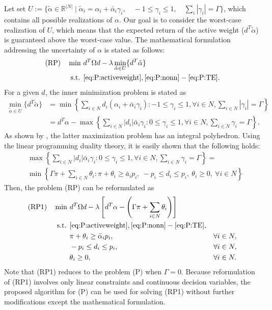 \documentclass[11pt]{article}
\begin{document}
	Let set $U := \{ \tilde \alpha \in \mathbb{R}^{|N|}  \mid \tilde \alpha_i = \alpha_i + \bar{\alpha}_i \gamma_i , \quad -1 \leq \gamma_i\leq 1 , \quad \sum_{i} |\gamma_i| = \Gamma \}$, which contains all possible realizations of $\alpha$. Our goal is to consider the worst-case realization of $U$, which means that the expected return of the active weight ($d^T \tilde{\alpha}$) is guaranteed above the worst-case value. The mathematical formulation addressing the uncertainty of $\alpha$ is stated as follows:
	\begin{align}
	\text{(RP)} \quad \min~ & d^T \Omega d - \lambda \min_{\tilde{\alpha} \in U} \{d^T \tilde{\alpha} \} \label{eq:RP:obj}\\
	\text{s.t. } 
	& \eqref{eq:P:activeweight}, \eqref{eq:P:nonn} - \eqref{eq:P:TE}. \notag
	\end{align}
	For a given $d$, the inner minimization problem is stated as
	\begin{align}
	\min_{\tilde{\alpha} \in U} \{ d^T \tilde{\alpha} \} &= \min \left\{ \sum_{i \in N} d_i (\alpha_i + \bar{\alpha}_i \gamma_i ) : -1 \le \gamma_i \le 1, \forall i \in N, \sum_{i \in N} |\gamma_i| = \Gamma  \right\}\\
	&= d^T \alpha - \max \left\{ \sum_{i \in N} |d_i| \bar{\alpha}_i \gamma_i : 0 \le \gamma_i \le 1, \forall i \in N, \sum_{i \in N} \gamma_i = \Gamma  \right\}.
	\end{align}
	As shown by \cite{bertsimas2004price}, the latter maximization problem has an integral polyhedron. Using the linear programming duality theory, it is easily shown that the following holds:
	\begin{align}
	&\max \left\{ \sum_{i \in N} |d_i| \bar{\alpha}_i \gamma_i : 0 \le \gamma_i \le 1, \forall i \in N, \sum_{i \in N} \gamma_i = \Gamma  \right\} =\\
	&\min \left\{ \Gamma \pi + \sum_{i \in N} \theta_i : \pi + \theta_i \ge \bar{a}_i p_i,~ -p_i \le d_i \le p_i,~ \theta_i \ge 0, ~\forall i \in N   \right\}
	\end{align}
	Then, the problem (RP) can be reformulated as
	\begin{align}
	\text{(RP1)} \quad \min~ & d^T \Omega d - \lambda \left[ d^T \alpha - \left(\Gamma \pi + \sum_{i \in N} \theta_i \right) \right] \label{eq:RP1:obj}\\
	\text{s.t. } 
	& \eqref{eq:P:activeweight}, \eqref{eq:P:nonn} - \eqref{eq:P:TE}, \notag\\
	& \pi + \theta_i \ge \bar{\alpha}_i p_i, & \forall i \in N, \\
	& -p_i \le d_i \le p_i, & \forall i \in N,\\
	& \theta_i \ge 0, & \forall i \in N.
	\end{align}
	Note that (RP1) reduces to the problem (P) when $\Gamma=0$. Because reformulation of (RP1) involves only linear constraints and continuous decision variables, the proposed algorithm for (P) can be used for solving (RP1) without further modifications except the mathematical formulation. 
	
\end{document}
